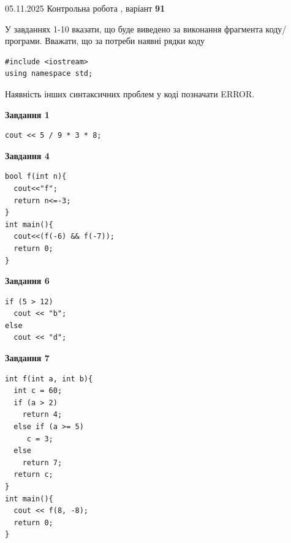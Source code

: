 \documentclass[12pt, ukrainian]{article}
\begin{document}
\newpage

{\Large{05.11.2025 Контрольна робота , варіант  \No \textbf { 91 }\par}}
{
\begin {large}
У завданнях 1-10 вказати, що буде виведено за виконання фрагмента коду/про\-гра\-ми.
Вважати, що за потреби наявні рядки коду
\begin{verbatim}
#include <iostream>
using namespace std;
\end{verbatim}
Наявність інших синтаксичних проблем у коді позначати ERROR.

\begin{minipage}[t]{7.0cm}

\begin{center}
\textbf{Завдання 1}
\end{center}
\vspace{-8mm}

\begin{verbatim}
cout << 5 / 9 * 3 * 8;
\end{verbatim}



\begin{center}
\textbf{Завдання 4}
\end{center}
\vspace{-8mm}

\begin{verbatim}
bool f(int n){
  cout<<"f";
  return n<=-3;
}
int main(){
  cout<<(f(-6) && f(-7));
  return 0;
}
\end{verbatim}



\begin{center}
\textbf{Завдання 6}
\end{center}
\vspace{-8mm}

\begin{verbatim}
if (5 > 12)
  cout << "b";
else
  cout << "d";
\end{verbatim}



\begin{center}
\textbf{Завдання 7}
\end{center}
\vspace{-8mm}

\begin{verbatim}
int f(int a, int b){
  int c = 60;
  if (a > 2)
    return 4;
  else if (a >= 5)
     c = 3;
  else
    return 7;
  return c;
}
int main(){
  cout << f(8, -8);
  return 0;
}
\end{verbatim}


\end{minipage}
\end{large}}
\end{document}

